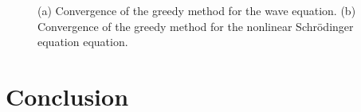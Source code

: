 \begin{figure}

\begin{minipage}{.5\linewidth}
\centering
{}
\end{minipage}%
\begin{minipage}{.5\linewidth}
\centering
{}
\end{minipage}\par\medskip
\centering

\caption{ (a) Convergence of the greedy method for the wave equation. (b) Convergence of the greedy method for the nonlinear Schr\"odinger equation equation. }
\label{fig:NuRe:5}
\end{figure}

\section{Conclusion} \label{chap:Con:1}

